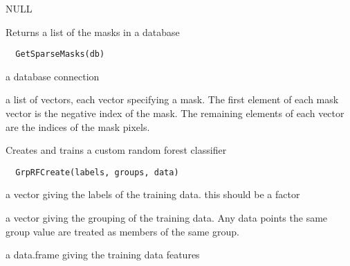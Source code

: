 \documentclass[a4paper]{book}
\begin{document}
%
\begin{Value}
NULL
\end{Value}
%
\begin{Description}\relax
Returns a list of the masks in a database
\end{Description}
%
\begin{Usage}
\begin{verbatim}
  GetSparseMasks(db)
\end{verbatim}
\end{Usage}
%
\begin{Arguments}
\begin{ldescription}
\item[\code{db}] a database connection
\end{ldescription}
\end{Arguments}
%
\begin{Value}
a list of vectors, each vector specifying a mask.  The
first element of each mask vector is the negative index
of the mask.  The remaining elements of each vector are
the indices of the mask pixels.
\end{Value}
%
\begin{Description}\relax
Creates and trains a custom random forest classifier
\end{Description}
%
\begin{Usage}
\begin{verbatim}
  GrpRFCreate(labels, groups, data)
\end{verbatim}
\end{Usage}
%
\begin{Arguments}
\begin{ldescription}
\item[\code{labels}] a vector giving the labels of the training
data.  this should be a factor

\item[\code{groups}] a vector giving the grouping of the
training data.  Any data points the same group value are
treated as members of the same group.

\item[\code{data}] a data.frame giving the training data
features
\end{ldescription}
\end{Arguments}
\end{document}
